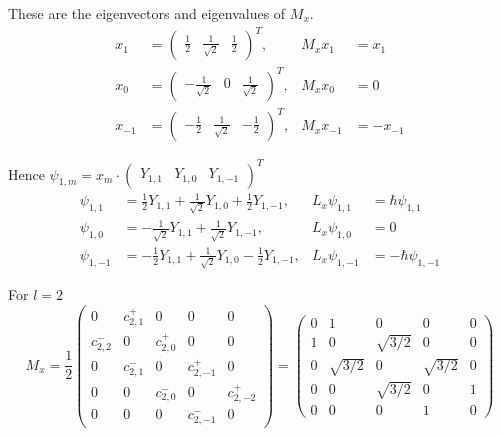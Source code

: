 These are the eigenvectors and eigenvalues of $M_x$.
\begin{align*}
x_1&=\begin{pmatrix}\frac{1}{2} & \frac{1}{\sqrt2} & \frac{1}{2}\end{pmatrix}^T, & M_xx_1&=x_1
\\[1ex]
x_0&=\begin{pmatrix}-\frac{1}{\sqrt2} & 0 & \frac{1}{\sqrt2}\end{pmatrix}^T, & M_xx_0&=0
\\[1ex]
x_{-1}&=\begin{pmatrix}-\frac{1}{2} & \frac{1}{\sqrt2} & -\frac{1}{2}\end{pmatrix}^T, & M_xx_{-1}&=-x_{-1}
\end{align*}

Hence $\psi_{1,m}=x_m\cdot\begin{pmatrix}Y_{1,1} & Y_{1,0} & Y_{1,-1}\end{pmatrix}^T$
\begin{align*}
\psi_{1,1}&=\frac{1}{2}Y_{1,1}+\frac{1}{\sqrt2}Y_{1,0}+\frac{1}{2}Y_{1,-1},
& L_x\psi_{1,1}&=\hbar\psi_{1,1}
\\[1ex]
\psi_{1,0}&=-\frac{1}{\sqrt2}Y_{1,1}+\frac{1}{\sqrt2}Y_{1,-1},
& L_x\psi_{1,0}&=0
\\[1ex]
\psi_{1,-1}&=-\frac{1}{2}Y_{1,1}+\frac{1}{\sqrt2}Y_{1,0}-\frac{1}{2}Y_{1,-1},
& L_x\psi_{1,-1}&=-\hbar\psi_{1,-1}
\end{align*}

For $l=2$
\begin{equation*}
M_x=\frac{1}{2}\begin{pmatrix}
0 & c_{2,1}^+ & 0 & 0 & 0
\\[1ex]
c_{2,2}^- & 0 & c_{2,0}^+ & 0 & 0
\\[1ex]
0 & c_{2,1}^- & 0 & c_{2,-1}^+ & 0
\\[1ex]
0 & 0 & c_{2,0}^- & 0 & c_{2,-2}^+
\\[1ex]
0 & 0 & 0 &c_{2,-1}^- & 0
\end{pmatrix}
=
\begin{pmatrix}
0 & 1 & 0 & 0 & 0
\\[1ex]
1 & 0 & \sqrt{3/2} & 0 & 0
\\[1ex]
0 & \sqrt{3/2} & 0 & \sqrt{3/2} & 0
\\[1ex]
0 & 0 & \sqrt{3/2} & 0 & 1
\\[1ex]
0 & 0 & 0 & 1 & 0
\end{pmatrix}
\end{equation*}

